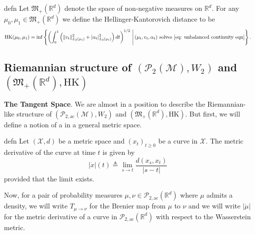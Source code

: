 \documentclass[11pt]{article}
\newcommand{\man}{\mathcal{M}}
\begin{document}
\begin{restatable}{defn}{}
    Let $\mathfrak{M}_+(\mathbb{R}^d)$ denote the space of non-negative measures on $\mathbb{R}^d$. For any $\mu_0, \mu_1 \in \mathfrak{M}_+(\mathbb{R}^d)$ we define the Hellinger-Kantorovich distance to be
    \begin{equation}
        \text{HK}(\mu_0, \mu_1) = \inf\left\{\left(\int_0^1 \left(\|v_t\|_{L_2(\mu_t)}^2 + |\alpha_t|_{L_2(\mu_t)}^2\right)dt\right)^{1/2} \, \Bigg| \, (\mu_t, v_t,  \alpha_t) \text{ solves \cref{eq: unbalanced continuity eqn}}\right\}.
    \end{equation}
\end{restatable}

\subsection{Riemannian structure of $(\mathcal{P}_{2}(\man), W_2)$ and $(\mathfrak{M}_+(\mathbb{R}^d), \text{HK})$}

\textbf{The Tangent Space}. We are almost in a position to describe the Riemannian-like structure of $(\mathcal{P}_{2, \text{ac}}(\man), W_2)$ and $(\mathfrak{M}_+(\mathbb{R}^d), \text{HK})$. But first, we will define a notion of a  in a general metric space.

\begin{restatable}{defn}{}
    Let $(\mathcal{X}, d)$ be a metric space and $(x_t)_{t \geq 0}$ be a curve in $\mathcal{X}$. The metric derivative of the curve at time $t$ is given by
    \begin{equation*}
        |\dot x|(t) \triangleq \lim_{s\rightarrow t}\frac{d(x_s, x_t)}{|s - t|}
    \end{equation*}
    provided that the limit exists. 
\end{restatable}

Now, for a pair of probability measures $\mu, \nu \in \mathcal{P}_{2, \text{ac}}(\mathbb{R}^d)$ where $\mu$ admits a density, we will write $T_{\mu \rightarrow \nu}$ for the Brenier map from $\mu$ to $\nu$ and we will write $|\dot \mu|$ for the metric derivative of a curve in $\mathcal{P}_{2, \text{ac}}(\mathbb{R}^d)$ with respect to the Wasserstein metric.
\end{document}
